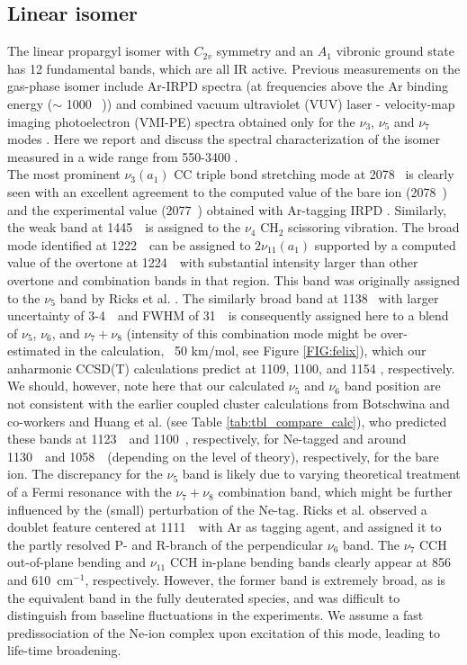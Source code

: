 \subsection{Linear isomer}
\label{linear}
\vspace{0.5cm}
The linear propargyl isomer with $C_{2v}$ symmetry and an $A_1$ vibronic ground state has 12 fundamental bands, which are all IR active. Previous measurements on the gas-phase \lin isomer include Ar-IRPD spectra (at frequencies above the Ar binding energy ($\sim$ 1000~ \wn)) \citep{RDS2010} and combined vacuum ultraviolet (VUV) laser - velocity-map imaging photoelectron (VMI-PE) spectra obtained only for the $\nu_3$, $\nu_5$ and $\nu_7$ modes \citep{GLY2012}. Here we report and discuss the spectral characterization of the \lin isomer measured in a wide range from 550-3400 \wn. \\

The most prominent $\nu_3(a_1)$ CC triple bond stretching mode at 2078 \wn\ is clearly seen with an excellent agreement to the computed value of the bare ion (2078~\wnn) and the experimental value (2077~\wnn) obtained with Ar-tagging IRPD \citep{RDS2010}. Similarly, the weak band at 1445~\wn\ is assigned to the $\nu_4$ CH$_2$ scissoring vibration. The broad mode identified at 1222~\wn\ can be assigned to $2\nu_{11} (a_1)$ supported by a computed value of the overtone at 1224~\wn\ with substantial intensity larger than other overtone and combination bands in that region. This band was originally assigned to the $\nu_5$ band by Ricks et al. \citep{RDS2010}.  The similarly broad band at 1138 \wn\ with larger uncertainty of 3-4~\wn\ and FWHM of 31~\wn\ is consequently assigned here to a blend of $\nu_5$, $\nu_6$, and $\nu_7+\nu_8$ (intensity of this combination mode might be over-estimated in the calculation, ~50 km/mol, see Figure \ref{FIG:felix}), which our anharmonic CCSD(T) calculations predict at 1109, 1100, and 1154 \wnn, respectively. We should, however, note here that our calculated $\nu_5$ and $\nu_6$ band position are not consistent with the earlier coupled cluster calculations from Botschwina and co-workers \citep{Botschwina2011, BOR2011} and Huang et al. \citep{HTL2011} (see Table \ref{tab:tbl_compare_calc}), who predicted these bands at 1123~\wn\ and 1100~\wnn, respectively, for Ne-tagged \lin and around 1130~\wn\ and 1058~\wn\ (depending on the level of theory), respectively, for the bare ion. The discrepancy for the $\nu_5$ band is likely due to varying theoretical treatment of a Fermi resonance with the $\nu_7+\nu_8$ combination band, which might be further influenced by the (small) perturbation of the Ne-tag. Ricks et al. \citep{RDS2010} observed a doublet feature centered at 1111~\wn\ with Ar as tagging agent, and assigned it to the partly resolved P- and R-branch of the perpendicular $\nu_6$ band.  The $\nu_7$ CCH out-of-plane bending and $\nu_{11}$ CCH in-plane bending bands clearly appear at 856 and 610~cm$^{-1}$, respectively. However, the former band is extremely broad, as is the equivalent band in the fully deuterated species, and was difficult to distinguish from baseline fluctuations in the experiments. We assume a fast predissociation of the Ne-ion complex upon excitation of this mode, leading to life-time broadening. \\

